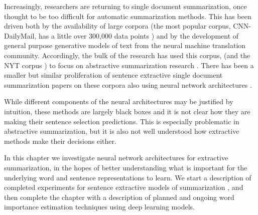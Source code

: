 
Increasingly, researchers are returning to single document summarization,
once thought to be too difficult for automatic summarization methods.
This has been driven both by the availability of large corpora (the
most popular corpus, CNN-DailyMail, has a little over 300,000 data points
\citep{see2017get}) and by the development of general purpose 
generative models of text from the neural machine translation community.
Accordingly, the bulk of the research has used this corpus, (and the NYT
corpus \citep{sandhaus2008new}) to focus on abstractive summarization
research \citep{rush2015neural,chopra2016abstractive,cheng2016neural,nallapati2016abstractive,see2017get,paulus2017deep}. 
There has been a smaller but similar proliferation of sentence
extractive single document summarization papers on these corpora also using 
neural network architectures \citep{cheng2016neural,nallapati2016classify,nallapati2016abstractive,narayan2018ranking}.

While different components of the neural architectures may be justified 
by intuition, these methods are largely black boxes and it is not clear
how they are making their sentence selection predictions. This is especially
problematic in abstractive summarization, but it is also not well understood
how extractive methods make their decisions either.

In this chapter we investigate neural network architectures for extractive
summarization, in the hopes of better understanding what is important 
for the underlying word and sentence representations to learn.
We start a description of completed experiments for sentence extractive
models of summarization \citep{kedzie2018deep}, and then complete the chapter with a description
of planned and ongoing word importance estimation techniques using deep
learning models.
